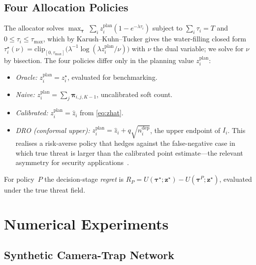 \documentclass[conference]{IEEEtran}
\begin{document}
\subsection{Four Allocation Policies}

The allocator solves
$\max_{\boldsymbol{\tau}}\;\sum_i z_i^{\mathrm{plan}}(1-e^{-\lambda\tau_i})$
subject to $\sum_i\tau_i=T$ and $0\le\tau_i\le\tau_{\max}$, which by
Karush--Kuhn--Tucker gives the water-filling closed form
$\tau_i^{\star}(\nu)=\mathrm{clip}_{[0,\tau_{\max}]}\!\bigl(\lambda^{-1}\log(\lambda z_i^{\mathrm{plan}}/\nu)\bigr)$
with $\nu$ the dual variable; we solve for $\nu$ by bisection. The four
policies differ only in the planning value $z_i^{\mathrm{plan}}$:
\begin{itemize}
  \item \emph{Oracle:} $z_i^{\mathrm{plan}} = z_i^{\star}$,
        evaluated for benchmarking.
  \item \emph{Naive:} $z_i^{\mathrm{plan}} = \sum_j\boldsymbol{\pi}_{i,j,K-1}$,
        uncalibrated soft count.
  \item \emph{Calibrated:} $z_i^{\mathrm{plan}}=\hat{z}_i$ from
        \eqref{eq:zhat}.
  \item \emph{DRO (conformal upper):}
        $z_i^{\mathrm{plan}}=\hat{z}_i+q\sqrt{n^{\mathrm{dep}}_i}$, the
        upper endpoint of $I_i$. This realises a risk-averse policy
        that hedges against the false-negative case in which true
        threat is larger than the calibrated point estimate---the
        relevant asymmetry for security
        applications~\cite{esfahani2018wasserstein}.
\end{itemize}
For policy~$P$ the decision-stage \emph{regret} is
$R_P=U(\boldsymbol{\tau}^{\star};\mathbf{z}^{\star})
-U(\boldsymbol{\tau}^{P};\mathbf{z}^{\star})$,
evaluated under the true threat field.

\section{Numerical Experiments}

\subsection{Synthetic Camera-Trap Network}
\end{document}
